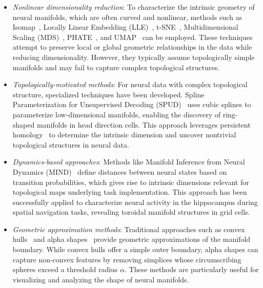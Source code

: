 \documentclass[11pt,a4paper]{article}
\begin{document}
\begin{enumerate}
\begin{itemize}
        \item \textit{Nonlinear dimensionality reduction}: To characterize the intrinsic geometry of neural manifolds, which are often curved and nonlinear, methods such as Isomap~\cite{tenenbaum2000global}, Locally Linear Embedding (LLE)~\cite{roweis2000nonlinear}, t-SNE~\cite{vandermaaten2008visualizing}, Multidimensional Scaling (MDS)~\cite{kruskal1964multidimensional}, PHATE~\cite{moon2019visualizing}, and UMAP~\cite{mcinnes2018umap} can be employed. These techniques attempt to preserve local or global geometric relationships in the data while reducing dimensionality. However, they typically assume topologically simple manifolds and may fail to capture complex topological structures.
        
        \item \textit{Topologically-motivated methods}: For neural data with complex topological structure, specialized techniques have been developed. Spline Parameterization for Unsupervised Decoding (SPUD)~\cite{chaudhuri2019intrinsic} uses cubic splines to parameterize low-dimensional manifolds, enabling the discovery of ring-shaped manifolds in head direction cells. This approach leverages persistent homology~\cite{edelsbrunner2008persistent, carlsson2009topology} to determine the intrinsic dimension and uncover nontrivial topological structures in neural data.
        
        \item \textit{Dynamics-based approaches}: Methods like Manifold Inference from Neural Dynamics (MIND)~\cite{chaudhuri2018intrinsic, gardner2022toroidal} define distances between neural states based on transition probabilities, which gives rise to intrinsic dimensions relevant for topological maps underlying task implementation. This approach has been successfully applied to characterize neural activity in the hippocampus during spatial navigation tasks, revealing toroidal manifold structures in grid cells.
        
        \item \textit{Geometric approximation methods}: Traditional approaches such as convex hulls~\cite{barber1996quickhull} and alpha shapes~\cite{edelsbrunner1994three} provide geometric approximations of the manifold boundary. While convex hulls offer a simple outer boundary, alpha shapes can capture non-convex features by removing simplices whose circumscribing spheres exceed a threshold radius $\alpha$. These methods are particularly useful for visualizing and analyzing the shape of neural manifolds.
        

\end{itemize}
\end{enumerate}
\end{document}
